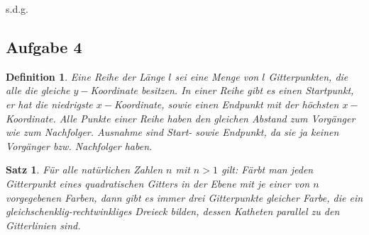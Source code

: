 \documentclass[12pt]{article}
\numberwithin{equation}{subsection}
\newtheorem{df}{Definition}
\newtheorem{satz}{Satz}
\begin{document}
s.d.g.

























\pagebreak
\subsection{Aufgabe 4}

\begin{df}
	Eine Reihe der Länge $l$ sei eine Menge von  $l$ Gitterpunkten, die alle die gleiche $y-$Koordinate besitzen. In einer Reihe gibt es einen Startpunkt, er hat die niedrigste $x-$Koordinate, sowie einen Endpunkt mit der höchsten $x-$Koordinate. Alle Punkte einer Reihe haben den gleichen Abstand zum Vorgänger wie zum Nachfolger. Ausnahme sind Start- sowie Endpunkt, da sie ja keinen Vorgänger bzw. Nachfolger haben.
\end{df}

\begin{satz}
	Für alle natürlichen Zahlen $n$ mit $n>1$ gilt:
	Färbt man jeden Gitterpunkt eines quadratischen Gitters in der Ebene mit je einer von $n$ vorgegebenen Farben, dann gibt es immer drei Gitterpunkte gleicher Farbe, die ein gleichschenklig-rechtwinkliges Dreieck bilden, dessen Katheten parallel zu den Gitterlinien sind. 
	\label{satz4}
\end{satz}
\end{document}
